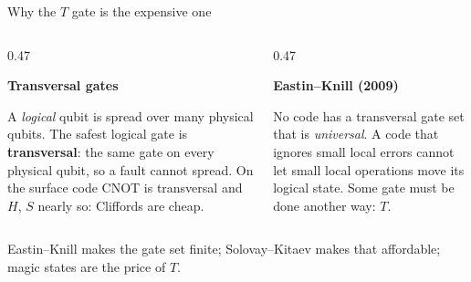 \documentclass[aspectratio=169,11pt]{beamer}
\newcommand{\blocktitle}[1]{{\bfseries #1}\par\vskip1mm}
\begin{document}
\begin{frame}{Why the $T$ gate is the expensive one}
  \begin{columns}[T]
    \begin{column}{0.47\textwidth}
      \begin{greyblock}
        \blocktitle{Transversal gates}
        A \emph{logical} qubit is spread over many physical qubits. The safest logical gate is \textbf{transversal}: the same gate on every physical qubit, so a fault cannot spread. On the surface code CNOT is transversal and $H$, $S$ nearly so: Cliffords are cheap.
      \end{greyblock}
    \end{column}
    \begin{column}{0.47\textwidth}
      \begin{greyblock}
        \blocktitle{Eastin--Knill (2009)}
        No code has a transversal gate set that is \emph{universal}. A code that ignores small local errors cannot let small local operations move its logical state. Some gate must be done another way: $T$.
      \end{greyblock}
    \end{column}
  \end{columns}
  \begin{takeaway}Eastin--Knill makes the gate set finite; Solovay--Kitaev makes that affordable; magic states are the price of $T$.\end{takeaway}
\end{frame}
\end{document}
